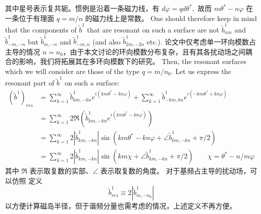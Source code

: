 其中星号表示复共轭。惯例是沿着一条磁力线，有 $d \varphi=q d \theta^{*},$ 故而 $m \theta^{*}-n \varphi$ 在一条位于有理面 $q=m / n$ 的磁力线上是常数。 One should therefore keep in mind that the components of $\tilde{b}^{1}$ that are resonant on such a surface are not $\tilde{b}_{m n}^{1}$ and $\tilde{b}_{-m,-n}^{1}$ but $\tilde{b}_{m,-n}^{1}$ and $\tilde{b}_{-m, n}^{1}$ (and also $\tilde{b}_{2 m,-2 n}^{1}$ etc.). \cite{nardon_edge_2007} 论文中仅考虑单一环向模数占主导的情况 $n=n_0$，由于本文讨论的环向模数分布复杂，且有其各扰动场之间耦合的影响，我们将拓展其在多环向模数下的研究。 Then, the resonant surfaces which we will consider are those of the type $q=m / n_{0} .$ Let us express the resonant part of $\tilde{b}^{1}$ on such a surface:
\begin{equation}
\begin{aligned}
  \left(\tilde{b}^{1}\right)_{r e s} &=\sum_{k=1}^{\infty} \tilde{b}_{km,-kn}^{1} e^{i\left(km \theta^{*}-kn \varphi\right)}+ \sum_{k=1}^{\infty}  \tilde{b}_{-km, kn}^{1} e^{i\left(-km \theta^{*}+kn \varphi\right)} \\
  &= \sum_{k=1}^{\infty}  2 \Re\left(\tilde{b}_{km,-kn}^{1} e^{i\left(km \theta^{*}-kn \varphi\right)}\right) \\
  &=\sum_{k=1}^{\infty}  2\left|\tilde{b}_{km,-kn}^{1}\right| \sin \left(km \theta^{*}-kn\varphi + \angle\tilde{b}_{km,-kn}^{1} + \pi/2 \right)\\
  &=\sum_{k=1}^{\infty}  2\left|\tilde{b}_{km,-kn}^{1}\right| \sin \left(km\chi + \angle\tilde{b}_{km,-kn}^{1} + \pi/2 \right)\qquad \chi = \theta^*- n/m \varphi
  \end{aligned}
\end{equation}
其中 $\Re$ 表示取复数的实部、$\angle $ 表示取复数的角度。 对于基频占主导的扰动场，可以仿照 \cite{nardon_edge_2007} 定义
\begin{equation}
  \tilde{b}_{res}^{1} \equiv 2\left|\tilde{b}_{m,-n_{0}}^{1}\right|
\end{equation}
以方便计算磁岛半径，但于谐频分量也需考虑的情况，上述定义不再方便。

